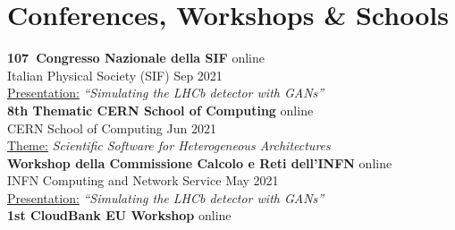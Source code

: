 \newcommand{\event}[2]
  {\normalsize \textbf{\color{hlcolor-0} #1} \hfill {\color{hlcolor-2} #2}}
  
\newcommand{\organizer}[2]
  {\small \color{hlcolor-1} {#1} \hfill {#2}}
  
\newcommand{\contribution}[3][]
  {\normalsize \color{maincolor} \ul{#2:} \emph{``#3''} {#1}}
  
\newcommand{\theme}[1]
  {\normalsize \color{maincolor} \ul{Theme:} \emph{#1}}
  
\newcommand{\button}[2]
  {\large \color{maincolor} \href{#1}{#2}}
  

\section*{Conferences, Workshops \& Schools}
\begin{cvcontent}
  \event{107\textdegree\ Congresso Nazionale della SIF}{online}\\
  \organizer{Italian Physical Society (SIF)}{Sep 2021}\\
  \contribution{Presentation}{Simulating the LHCb detector with GANs} \hfill
  \button{https://materiali.jmax.pics/materiale/simulating-the-lhcb-detector-with-generative-adversarial-networks/?u=2445}{\faFilm}
  \\ [4mm]
  \event{8th Thematic CERN School of Computing}{online}\\
  \organizer{CERN School of Computing}{Jun 2021}\\
  \theme{Scientific Software for Heterogeneous Architectures} \hfill
  \button{https://indico.cern.ch/event/1017080/}{\faGlobe}
  \\ [4mm]
  \event{Workshop della Commissione Calcolo e Reti dell'INFN}{online}\\
  \organizer{INFN Computing and Network Service}{May 2021}\\
  \contribution{Presentation}{Simulating the LHCb detector with GANs} \hfill
  \button{https://agenda.infn.it/event/25889/contributions/135750/attachments/81865/107438/Simulating\%20the\%20LHCb\%20detector\%20with\%20GAN\%20-\%20WS\%20CCR\%2027.05.2021.pdf}{\faFilePdf[regular]}
  \button{https://agenda.infn.it/event/25889/contributions/135750/}{\faGlobe}
  \\ [4mm]
  \event{1st CloudBank EU Workshop}{online}\\

\end{cvcontent}
